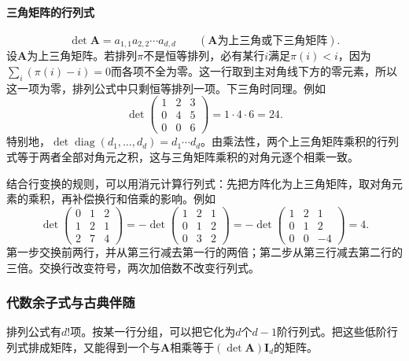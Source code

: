 \paragraph{三角矩阵的行列式}
\[
 \det\bm A=a_{1,1}a_{2,2}\cdots a_{d,d}\qquad(\bm A\text{为上三角或下三角矩阵}).
\]
设$\bm A$为上三角矩阵。若排列$\pi$不是恒等排列，必有某行$i$满足$\pi(i)<i$，因为$\sum_i(\pi(i)-i)=0$而各项不全为零。这一行取到主对角线下方的零元素，所以这一项为零，排列公式中只剩恒等排列一项。下三角时同理。例如
\[
 \det\begin{pmatrix}1&2&3\\0&4&5\\0&0&6\end{pmatrix}=1\cdot4\cdot6=24.
\]
特别地，$\det\operatorname{diag}(d_1,\ldots,d_d)=d_1\cdots d_d$。由乘法性，两个上三角矩阵乘积的行列式等于两者全部对角元之积，这与三角矩阵乘积的对角元逐个相乘一致。

结合行变换的规则，可以用消元计算行列式：先把方阵化为上三角矩阵，取对角元素的乘积，再补偿换行和倍乘的影响。例如
\[
 \det\begin{pmatrix}0&1&2\\1&2&1\\2&7&4\end{pmatrix}
 =-\det\begin{pmatrix}1&2&1\\0&1&2\\0&3&2\end{pmatrix}
 =-\det\begin{pmatrix}1&2&1\\0&1&2\\0&0&-4\end{pmatrix}=4.
\]
第一步交换前两行，并从第三行减去第一行的两倍；第二步从第三行减去第二行的三倍。交换行改变符号，两次加倍数不改变行列式。

\subsubsection{代数余子式与古典伴随}
\label{sec:ls-det-cofactor-adjugate}

排列公式有$d!$项。按某一行分组，可以把它化为$d$个$d-1$阶行列式。把这些低阶行列式排成矩阵，又能得到一个与$\bm A$相乘等于$(\det\bm A)\bm I_d$的矩阵。

